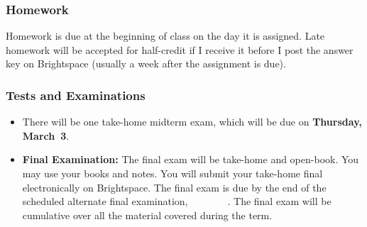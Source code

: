 \documentclass[11pt,twoside]{jgsyllabus}\usepackage[]{graphicx}\usepackage[]{color}
\begin{document}
\subsubsection{Homework}
Homework is due at the beginning of class on the day it is assigned.
Late homework will be accepted for half-credit if I receive it before I post
the answer key on Brightspace (usually a week after the assignment is due).
\fi
\iffalse
  \subsubsection{Projects}
  You will do a few extended projects, which constitute policy analyses of
  possible measures to reduce greenhouse gas emissions.
\fi

\subsubsection{Tests and Examinations}
\begin{itemize}
  \iffalse
    \item There will be one in-class midterm exam, on
      \textbf{Thursday, March~3}.
      This test will be closed book.
      I will hold a review session before the test.
      \textbf{You will need to bring a calculator, number two pencils,
        and erasers to the in-class test.}
  \else
     \item There will be one take-home midterm exam, which will be due on
       \textbf{Thursday, March~3}.
  \fi
  \item \textbf{Final Examination:}
      The final exam will be take-home and open-book.
      You may use your books and notes.
      You will submit your take-home final electronically on Brightspace.
      The final exam is due by the end of the scheduled
      \ifAltFinal alternate \fi final examination,
      \ifAltFinal
        \AltFinalExamEndTime\ \AltFinalExamDay\
        \AltFinalExamMonth~\AltFinalExamDate
      \else
        \FinalExamEndTime\ \FinalExamDay\ \FinalExamMonth~\FinalExamDate
      \fi.
      The final exam will be cumulative over all the material covered during
      the term.
\end{itemize}

\end{document}

